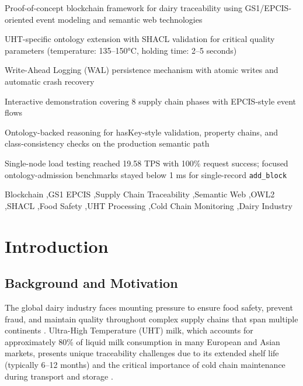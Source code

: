 \documentclass[preprint,review,12pt,authoryear]{elsarticle}
\begin{document}
\begin{frontmatter}
\begin{highlights}
\item Proof-of-concept blockchain framework for dairy traceability using GS1/EPCIS-oriented event modeling and semantic web technologies
\item UHT-specific ontology extension with SHACL validation for critical quality parameters (temperature: 135--150°C, holding time: 2--5 seconds)
\item Write-Ahead Logging (WAL) persistence mechanism with atomic writes and automatic crash recovery
\item Interactive demonstration covering 8 supply chain phases with EPCIS-style event flows
\item Ontology-backed reasoning for hasKey-style validation, property chains, and class-consistency checks on the production semantic path
\item Single-node load testing reached 19.58 TPS with 100\% request success; focused ontology-admission benchmarks stayed below 1 ms for single-record \texttt{add\_block}
\end{highlights}

\begin{keyword}
Blockchain \sep GS1 EPCIS \sep Supply Chain Traceability \sep Semantic Web \sep OWL2 \sep SHACL \sep Food Safety \sep UHT Processing \sep Cold Chain Monitoring \sep Dairy Industry
\end{keyword}

\end{frontmatter}
\hypersetup{pageanchor=true}

\linenumbers

\section{Introduction}\label{sec:introduction}

\subsection{Background and Motivation}

The global dairy industry faces mounting pressure to ensure food safety, prevent fraud, and maintain quality throughout complex supply chains that span multiple continents \cite{bolton2020don}. Ultra-High Temperature (UHT) milk, which accounts for approximately 80\% of liquid milk consumption in many European and Asian markets, presents unique traceability challenges due to its extended shelf life (typically 6--12 months) and the critical importance of cold chain maintenance during transport and storage \cite{perkins2010dynamic}.
\end{document}

